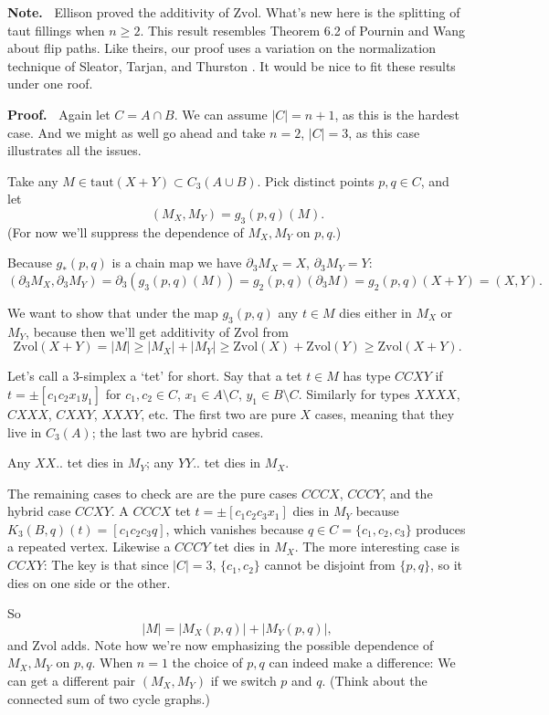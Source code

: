 \documentclass[12pt]{article}
\newcommand{\proofstart}{{\noindent \bf Proof.\ }}
\newcommand{\note}{{\noindent \bf Note.\ }}
\def\del{\partial}
\newcommand{\union}{\cup}
\newcommand{\kw}{\mathrm}
\newcommand{\taut}{\kw{taut}}
\newcommand{\Zvol}{\kw{Zvol}}
\begin{document}
\note
Ellison \cite{ellison:gap}
proved the additivity of $\Zvol$.
What's new here is the splitting of taut fillings when $n\geq 2$.
This result resembles Theorem 6.2 of
Pournin and Wang
\cite{pw:flip}
about flip paths.
Like theirs, our proof uses a variation on the normalization technique
of Sleator, Tarjan, and Thurston
\cite[Lemma 7]{stt:jams}.
It would be nice to fit these results under one roof.
\medskip

\proofstart
Again let $C = A \cap B$.
We can assume $|C| = n+1$,
as this is the hardest case.
And we might as well go ahead and take $n=2$, $|C|=3$,
as this case illustrates all the issues.

Take any $M \in \taut(X+Y) \subset C_3(A \union B)$.
Pick distinct points $p,q \in C$,
and let
\[
(M_X,M_Y) = g_{3}(p,q)(M)
.
\]
(For now we'll suppress the dependence of $M_X,M_Y$ on $p,q$.)

Because $g_*(p,q)$ is a chain map we have
$\del_{3} M_X = X$, $\del_{3} M_Y = Y$:
\[
(\del_{3} M_X, \del_{3} M_Y)
=
\del_{3} (g_{3}(p,q)(M))
=
g_2(p, q)(\del_{3} M)
=
g_2(p,q)(X+Y)
=
(X,Y)
.
\]

We want to show that under the map $g_3(p,q)$ any $t \in M$
dies either in $M_X$ or $M_Y$,
because then we'll get additivity of $\Zvol$ from
\[
\Zvol(X+Y) = |M|
\geq |M_X| + |M_Y|
\geq \Zvol(X) + \Zvol(Y)
\geq \Zvol(X+Y)
.
\]

Let's call a $3$-simplex a `tet' for short.
Say that a tet $t \in M$ has type $CCXY$ if $t= \pm[c_1c_2x_1y_1]$
for $c_1,c_2 \in C$, $x_1 \in A \setminus C$, $y_1 \in B \setminus C$.
Similarly for types $XXXX$, $CXXX$, $CXXY$, $XXXY$, etc.
The first two are pure $X$ cases, meaning that they live in $C_3(A)$;
the last two are hybrid cases.

Any $XX..$ tet dies in $M_Y$;
any $YY..$ tet dies in $M_X$.

The remaining cases to check are
are the pure cases $CCCX$, $CCCY$,
and the hybrid case $CCXY$.
A $CCCX$ tet $t=\pm[c_1c_2c_3x_1]$ dies in $M_Y$ because
$K_3(B,q)(t)=[c_1c_2c_3q]$,
which vanishes because $q \in C = \{c_1,c_2,c_3\}$ produces a repeated vertex.
Likewise a $CCCY$ tet dies in $M_X$.
The more interesting case is $CCXY$:
The key is that since $|C|=3$, $\{c_1,c_2\}$ cannot be disjoint from $\{p,q\}$,
so it dies on one side or the other.

So 
\[
|M| = |M_X(p,q)| + |M_Y(p,q)|,
\]
and $\Zvol$ adds.
Note how we're now emphasizing the possible dependence of $M_X,M_Y$ on $p,q$.
When $n=1$ the choice of $p,q$ can indeed make a difference:
We can get a different pair $(M_X,M_Y)$ if we switch
$p$ and $q$.
(Think about the connected sum of two cycle graphs.)
\end{document}
